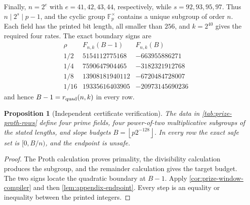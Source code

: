 \documentclass[11pt,a4paper]{amsart}
\numberwithin{equation}{section}
\newtheorem{proposition}[proposition]{Proposition}
\theoremstyle{remark}
\newcommand{\F}{\mathbb F}
\newcommand{\floor}[1]{\left\lfloor #1\right\rfloor}
\begin{document}
Finally, \(n=2^e\) with \(e=41,42,43,44\), respectively, while
\(s=92,93,95,97\).  Thus \(n\mid2^s\mid p-1\), and the cyclic group
\(\F_p^\times\) contains a unique subgroup of order \(n\).  Each field
has the printed bit length, all smaller than \(256\), and
\(k=2^{40}\) gives the required four rates.  The exact boundary signs are
\[
\begin{array}{c|r|r}
 \rho&F_{n,k}(B-1)&F_{n,k}(B)\\ \hline
 1/2&5154112775168&-663955886271\\
 1/4&7590647904465&-3182321912768\\
 1/8&13908181940112&-6720484728007\\
 1/16&19335616403905&-20973145690236
\end{array}
\]
and hence \(B-1=r_{\rm quad}(n,k)\) in every row.

\begin{proposition}[Independent certificate verification]
\label{prop:appendix-certificate-verification}
The data in \cref{tab:prize-proth-rows} define four prime fields, four
power-of-two multiplicative subgroups of the stated lengths, and slope
budgets \(B=\floor{p2^{-128}}\).  In every row the exact safe set is
\([0,B/n)\), and the endpoint is unsafe.
\end{proposition}

\begin{proof}
The Proth calculation proves primality, the divisibility calculation
produces the subgroup, and the remainder calculation gives the target
budget.  The two signs locate the quadratic boundary at \(B-1\).
Apply \cref{cor:prize-window-compiler} and then
\cref{lem:appendix-endpoint}.  Every step is an equality or inequality
between the printed integers.
\end{proof}
\end{document}
